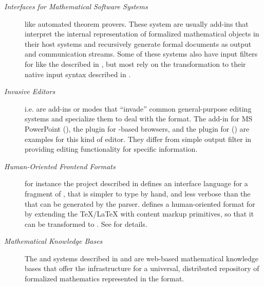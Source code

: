 \begin{description}
\item[{\emph{Interfaces for Mathematical Software Systems}}] like
  automated theorem provers. These system are usually add-ins that interpret the internal
  representation of formalized mathematical objects in their host systems and recursively
  generate formal {\omdoc} documents as output and communication streams. Some of these
  systems also have input filters for {\omdoc} like the {\verifun} described in
  {}, but most rely on the {\omdoc} transformation to their native input
  syntax described in {}.
\item[\emph{Invasive Editors}] i.e. are add-ins or modes that
  ``invade'' common general-purpose editing systems and specialize them to deal with the
  {\omdoc} format.  The {\cpoint} add-in for MS PowerPoint ({}), the
  {\sentido} plugin for {\mozilla}-based browsers, and the plugin for {\texmacs}
  ({}) are examples for this kind of editor. They differ from simple
  output filter in providing editing functionality for {\omdoc} specific information.
\item[\emph{Human-Oriented Frontend Formats}] for
  instance the {\qmath} project described in {} defines an interface
  language for a fragment of {\omdoc}, that is simpler to type by hand, and less verbose
  than the {\omdoc} that can be generated by the {} parser. {\stex} defines
  a human-oriented format for {\omdoc} by extending the {\TeX/\LaTeX} with content markup
  primitives, so that it can be transformed to {\omdoc}. See {} for
  details.
\item [\emph{Mathematical Knowledge Bases}] The
  {\mbase} and {\maya} systems described in {} and {} are web-based
  mathematical knowledge bases that offer the infrastructure for a universal, distributed
  repository of formalized mathematics represented in the {\omdoc} format.
\end{description}


